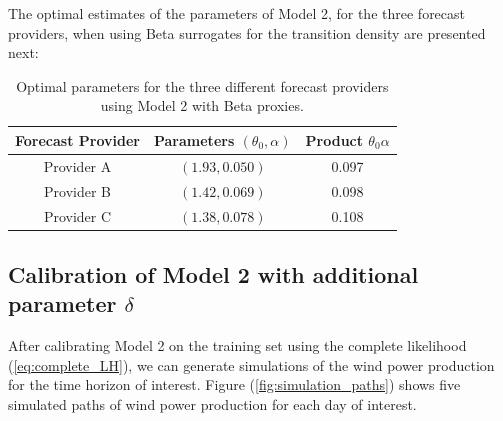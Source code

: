 \documentclass[11pt]{article}
\theoremstyle{definition}
\begin{document}
The optimal estimates of the parameters of Model 2, for the three forecast providers, when using Beta surrogates for the transition density are presented next:
\begin{table}[H]
\centering
\begin{tabular}{ccc}
\toprule
Forecast Provider & Parameters $(\theta_0, \alpha)$ & Product $\theta_0\alpha$ \\ \midrule
Provider A  & $(1.93,0.050)$  &  0.097 \\
Provider B  & $(1.42,0.069) $  &  0.098 \\ 
Provider C  & $(1.38,0.078) $  &  0.108 \\ 
\bottomrule
\end{tabular}
\caption{Optimal parameters for the three different forecast providers using Model 2 with Beta proxies.}
\label{tab:forcast_comparison}
\end{table}


\subsection{Calibration of Model 2 with additional parameter $\delta$}

After calibrating Model 2 on the training set using the complete likelihood (\ref{eq:complete_LH}), we can generate simulations of the wind power production for the time horizon of interest. Figure (\ref{fig:simulation_paths}) shows five simulated paths of wind power production for each day of interest.
\end{document}
